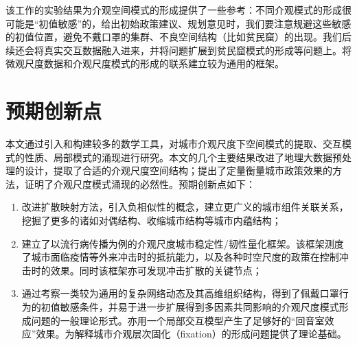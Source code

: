 该工作的实验结果为介观空间模式的形成提供了一些参考：不同介观模式的形成很可能是“初值敏感”的，给出初始政策建议、规划意见时，我们要注意规避这些敏感的初值位置，避免不戴口罩的集群、不良空间结构（比如贫民窟）的出现。我们后续还会将真实交互数据融入进来，并将问题扩展到贫民窟模式的形成等问题上。将微观尺度数据和介观尺度模式的形成的联系建立较为通用的框架。



\section{预期创新点}

本文通过引入和构建较多的数学工具，对城市介观尺度下空间模式的提取、交互模式的性质、局部模式的涌现进行研究。本文的几个主要结果改进了地理大数据预处理的设计，提取了合适的介观尺度空间结构；提出了定量衡量城市政策效果的方法，证明了介观尺度模式涌现的必然性。预期创新点如下：\begin{enumerate}
    \item 改进扩散映射方法，引入负相似性的概念，建立更广义的城市组件关联关系，挖掘了更多的诸如对偶结构、收缩城市结构等城市内蕴结构；
    \item 建立了以流行病传播为例的介观尺度城市稳定性/韧性量化框架。该框架测度了城市面临疫情等外来冲击时的抵抗能力，以及各种时空尺度的政策在控制冲击时的效果。同时该框架亦可发现冲击扩散的关键节点；
    \item 通过考察一类较为通用的复杂网络动态及其高维组织结构，得到了佩戴口罩行为的初值敏感条件，并易于进一步扩展得到多因素共同影响的介观尺度模式形成问题的一般理论形式。亦用一个局部交互模型产生了足够好的“回音室效应”效果。为解释城市介观层次固化（fixation）的形成问题提供了理论基础。
\end{enumerate}